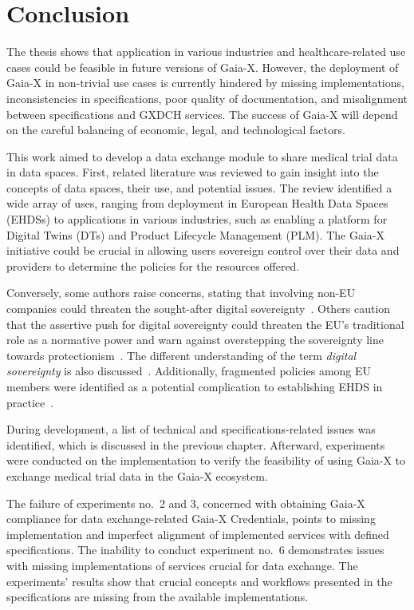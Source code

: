 \chapter{Conclusion}\label{ch:conclusion}

The thesis shows that application in various industries and healthcare-related use cases could be feasible in future versions of Gaia-X.
However, the deployment of Gaia-X in non-trivial use cases is currently hindered by missing implementations, inconsistencies in specifications, poor quality of documentation, and misalignment between specifications and GXDCH services.
The success of Gaia-X will depend on the careful balancing of economic, legal, and technological factors.

This work aimed to develop a data exchange module to share medical trial data in data spaces.
First, related literature was reviewed to gain insight into the concepts of data spaces, their use, and potential issues.
The review identified a wide array of uses, ranging from deployment in European Health Data Spaces (EHDSs) to applications in various industries, such as enabling a platform for Digital Twins (DTs) and Product Lifecycle Management (PLM).
The Gaia-X initiative could be crucial in allowing users sovereign control over their data and providers to determine the policies for the resources offered.

Conversely, some authors raise concerns, stating that involving non-EU companies could threaten the sought-after digital sovereignty~\cite{europe_quest_for_digital_sovereignty}.
Others caution that the assertive push for digital sovereignty could threaten the EU's traditional role as a normative power and warn against overstepping the sovereignty line towards protectionism~\cite{dig_sovereignty_challenges}.
The different understanding of the term \textit{digital sovereignty} is also discussed~\cite{discursive_struggle_for_digital_sovereignty}.
Additionally, fragmented policies among EU members were identified as a potential complication to establishing EHDS in practice~\cite{legal_and_technological_aspects_of_ehds}.

During development, a list of technical and specifications-related issues was identified, which is discussed in the previous chapter.
Afterward, experiments were conducted on the implementation to verify the feasibility of using Gaia-X to exchange medical trial data in the Gaia-X ecosystem.

The failure of experiments no.~2 and 3, concerned with obtaining Gaia-X compliance for data exchange-related Gaia-X Credentials, points to missing implementation and imperfect alignment of implemented services with defined specifications.
The inability to conduct experiment no.~6 demonstrates issues with missing implementations of services crucial for data exchange.
The experiments' results show that crucial concepts and workflows presented in the specifications are missing from the available implementations.

